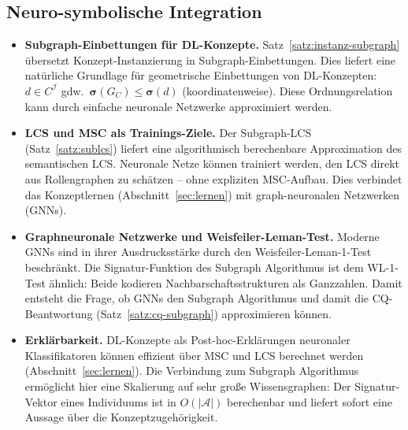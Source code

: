 ﻿\documentclass[a4paper,12pt]{article}
\theoremstyle{definition}
\theoremstyle{plain}
\theoremstyle{remark}
\newcommand{\Abox}{\ensuremath{\mathcal{A}}}
\newcommand{\interp}[1]{\ensuremath{\mathcal{#1}}}
\begin{document}
\subsection{Neuro-symbolische Integration}

\begin{itemize}
  \item \textbf{Subgraph-Einbettungen f{\"u}r DL-Konzepte.}
        Satz~\ref{satz:instanz-subgraph} {\"u}bersetzt Konzept-Instanzierung
        in Subgraph-Einbettungen. Dies liefert eine nat{\"u}rliche
        Grundlage f{\"u}r geometrische Einbettungen von DL-Konzepten:
        $d \in C^\interp{I}$ gdw.\ $\boldsymbol{\sigma}(G_C) \leq \boldsymbol{\sigma}(d)$
        (koordinatenweise). Diese Ordnungsrelation kann durch
        einfache neuronale Netzwerke approximiert werden.

  \item \textbf{LCS und MSC als Trainings-Ziele.}
        Der Subgraph-LCS (Satz~\ref{satz:sublcs}) liefert eine
        algorithmisch berechenbare Approximation des semantischen LCS.
        Neuronale Netze k{\"o}nnen trainiert werden, den LCS direkt
        aus Rollengraphen zu sch{\"a}tzen -- ohne expliziten MSC-Aufbau.
        Dies verbindet das Konzeptlernen (Abschnitt~\ref{sec:lernen})
        mit graph-neuronalen Netzwerken (GNNs).

  \item \textbf{Graphneuronale Netzwerke und Weisfeiler-Leman-Test.}
        Moderne GNNs sind in ihrer Ausdrucksst{\"a}rke durch den
        Weisfeiler-Leman-1-Test beschr{\"a}nkt.
        Die Signatur-Funktion des Subgraph Algorithmus ist dem
        WL-1-Test {\"a}hnlich: Beide kodieren Nachbarschaftsstrukturen
        als Ganzzahlen. Damit entsteht die Frage, ob GNNs
        den Subgraph Algorithmus und damit die CQ-Beantwortung
        (Satz~\ref{satz:cq-subgraph}) approximieren k{\"o}nnen.

  \item \textbf{Erkl{\"a}rbarkeit.}
        DL-Konzepte als Post-hoc-Erkl{\"a}rungen neuronaler Klassifikatoren
        k{\"o}nnen effizient {\"u}ber MSC und LCS berechnet werden
        (Abschnitt~\ref{sec:lernen}).
        Die Verbindung zum Subgraph Algorithmus erm{\"o}glicht hier
        eine Skalierung auf sehr gro{\ss}e Wissensgraphen:
        Der Signatur-Vektor eines Individuums ist in $O(|\Abox|)$
        berechenbar und liefert sofort eine Aussage {\"u}ber
        die Konzeptzugeh{\"o}rigkeit.
\end{itemize}
\end{document}
